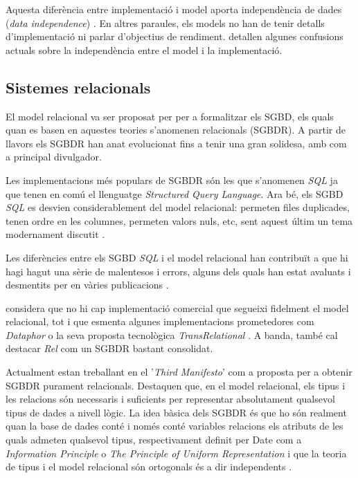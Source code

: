 Aquesta diferència entre implementació i model aporta independència de dades (\emph{data independence}) \parencite{date:dictionary}. En altres paraules, els models no han de tenir detalls d'implementació ni parlar d'objectius de rendiment. 
\textcite{dbdebunk} detallen algunes confusions actuals sobre la independència entre el model i la implementació.







\subsection{Sistemes relacionals}
\label{sec:estat:sgbdr}

El model relacional va ser proposat per \textcite{codd70} per a
formalitzar els SGBD, els quals quan es basen en aquestes teories
s'anomenen relacionals (SGBDR). A partir de llavors els SGBDR han anat
evolucionat fins a tenir una gran solidesa, amb
\textcite{date:introduction,date06,date:dictionary} com a principal
divulgador.



Les implementacions més populars de SGBDR són les que s'anomenen
\emph{SQL} ja que tenen en comú el llenguatge \emph{Structured Query
  Language}. Ara bé, els SGBD \emph{SQL} es desvien considerablement
del model relacional: permeten files duplicades, tenen ordre en les
columnes, permeten valors nuls, etc, sent aquest últim un tema
modernament discutit \parencite{date08:nulls}.

Les diferències entre els SGBD \emph{SQL} i el model relacional han
contribuït a que hi hagi hagut una sèrie de malentesos i
errors, alguns dels quals han estat avaluats i desmentits per
\citeauthor{dbdebunk} en vàries
publicacions \parencite{dbdebunk,date06}.
  

\textcite[cap.~2]{date06} %
considera que no hi cap implementació comercial que segueixi fidelment
el model relacional, tot i que esmenta algunes implementacions
prometedores com \emph{Dataphor} o la seva proposta tecnològica
\emph{TransRelational} \parencite{date:transrelational}. A banda,
també cal destacar \emph{Rel} \parencite{rel} com un SGBDR bastant
consolidat.



Actualment \textcite{date:thethirdmanifesto} estan treballant en el
'\emph{Third Manifesto}' com a proposta per a obtenir SGBDR purament
relacionals. Destaquen que, en el model relacional, els tipus i les
relacions són necessaris i suficients per representar absolutament
qualsevol tipus de dades a nivell lògic. %
La idea bàsica dels SGBDR és que ho són realment quan la base de dades conté i només conté variables relacions els atributs de les quals admeten qualsevol tipus, respectivament definit per Date com a \emph{Information Principle} o \emph{The Principle of Uniform Representation} \parencite{date:dictionary} i que la teoria de tipus i el model relacional són ortogonals és a dir independents \parencite[cap.~6]{date06}.

